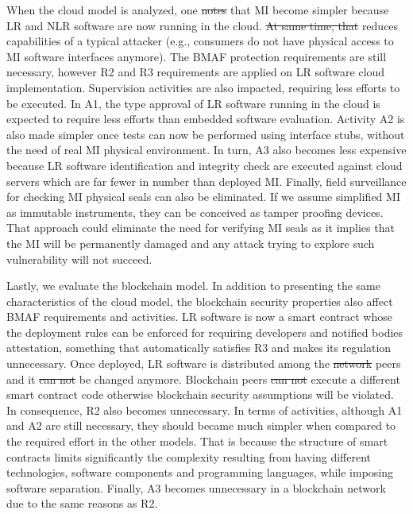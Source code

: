 \documentclass[journal]{IEEEtran}
\providecommand{\DIFadd}[1]{{\protect\color{blue}\uwave{#1}}} %
\providecommand{\DIFdel}[1]{{\protect\color{red}\sout{#1}}}                      %
\providecommand{\DIFaddbegin}{} %
\providecommand{\DIFaddend}{} %
\providecommand{\DIFdelbegin}{} %
\providecommand{\DIFdelend}{} %
\begin{document}
When the cloud model is analyzed, one \DIFdelbegin \DIFdel{notes }\DIFdelend \DIFaddbegin \DIFadd{can notice }\DIFaddend that MI become simpler because LR and NLR software are now running in the cloud. 
\DIFdelbegin \DIFdel{At same time, that }\DIFdelend \DIFaddbegin \DIFadd{Additionally, such situation }\DIFaddend reduces capabilities of a typical attacker (e.g., consumers do not have physical access to MI software interfaces anymore).
The BMAF protection requirements are still necessary, however R2 and R3 requirements are applied on LR software cloud implementation. Supervision activities are also impacted, requiring less efforts to be executed. In A1, the type approval of LR software running in the cloud is expected to require less efforts than embedded software evaluation. Activity A2 is also made simpler once tests can now be performed using interface stubs, without the need of real MI physical environment. In turn, A3 also becomes less expensive because LR software identification and integrity check are executed against cloud servers which are far fewer in number than deployed MI. Finally, field surveillance for checking MI physical seals can also be eliminated. If we assume simplified MI as immutable instruments, they can be conceived as tamper proofing devices. That approach could eliminate the need for verifying MI seals as it implies that the MI will be permanently damaged and any attack trying to explore such vulnerability will not succeed.

Lastly, we evaluate the blockchain model. 
In addition to presenting the same characteristics of the cloud model, the blockchain security properties also affect BMAF requirements and activities. 
LR software is now a smart contract whose the deployment rules can be enforced for requiring developers and notified bodies attestation, something that automatically satisfies R3 and makes its regulation unnecessary.
Once deployed, LR software is distributed among the \DIFdelbegin \DIFdel{network }\DIFdelend peers and it \DIFdelbegin \DIFdel{can not }\DIFdelend \DIFaddbegin \DIFadd{cannot }\DIFaddend be changed anymore.
Blockchain peers \DIFdelbegin \DIFdel{can not }\DIFdelend \DIFaddbegin \DIFadd{cannot }\DIFaddend execute a different smart contract code otherwise blockchain security assumptions will be violated.
In consequence, R2 also becomes unnecessary. In terms of activities, although A1 and A2 are still necessary, they should became much simpler when compared to the required effort in the other models.
That is because the structure of smart contracts limits significantly the complexity resulting from having different technologies, software components and programming languages, while imposing software separation.
Finally, A3 becomes unnecessary in a blockchain network due to the same reasons as R2.
\end{document}
